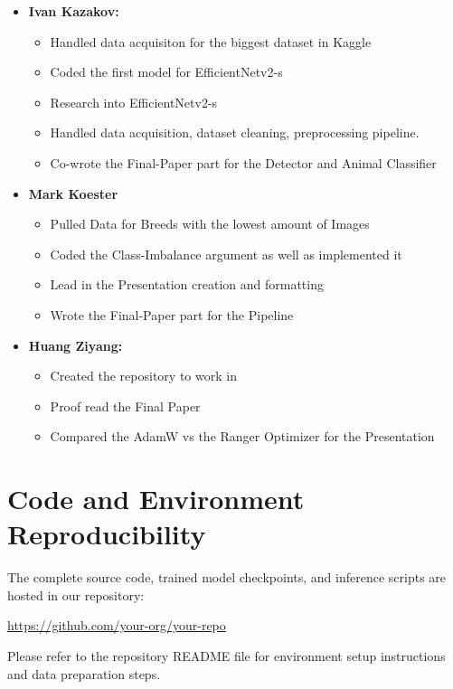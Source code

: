 \begin{itemize}
    \item \textbf{Ivan Kazakov:} 
    \begin{itemize}
        \item Handled data acquisiton for the biggest dataset in Kaggle
        \item Coded the first model for EfficientNetv2-s
        \item Research into EfficientNetv2-s
        \item Handled data acquisition, dataset cleaning, preprocessing pipeline.
        \item Co-wrote the Final-Paper part for the Detector and Animal Classifier

    \end{itemize}
    
    \item \textbf{Mark Koester } 
    \begin{itemize}
        \item Pulled Data for Breeds with the lowest amount of Images
        \item Coded the Class-Imbalance argument as well as implemented it
        \item Lead in the Presentation creation and formatting
        \item Wrote the Final-Paper part for the Pipeline

    \end{itemize}

    \item \textbf{Huang Ziyang: } 
    \begin{itemize}
        \item Created the repository to work in
        \item Proof read the Final Paper
        \item Compared the AdamW vs the Ranger Optimizer for the Presentation
    \end{itemize}
\end{itemize}

\section{Code and Environment Reproducibility}
\label{sec:code_reproducibility}

The complete source code, trained model checkpoints, and inference scripts are hosted in our repository:
\begin{center}
    \url{https://github.com/your-org/your-repo}
\end{center}
Please refer to the repository README file for environment setup instructions and data preparation steps.